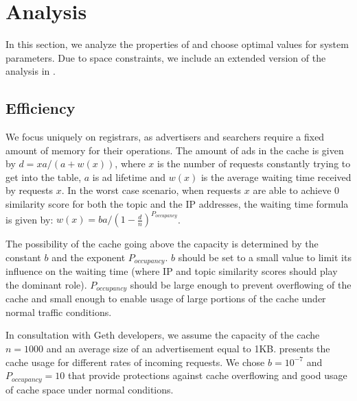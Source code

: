 \section{Analysis}\label{sec:analysis}
In this section, we analyze the properties of \sysname and choose optimal values for system parameters. Due to space constraints, we include an extended version of the analysis in .
\subsection{Efficiency}

We focus uniquely on registrars, as advertisers and searchers require a fixed amount of memory for their operations. The amount of ads in the cache is given by $d = xa/(a + w(x))$, where $x$ is the number of requests constantly trying to get into the table, $a$ is ad lifetime and $w(x)$ is the average waiting time received by requests $x$.
In the worst case scenario, when requests $x$ are able to achieve 0 similarity score for both the topic and the IP addresses, the waiting time formula is given by: $w(x) = ba/(1 - \frac{d}{n})^{P_\textit{occupancy}}$.

The possibility of the cache going above the capacity is determined by the constant $b$ and the exponent $P_\textit{occupancy}$. $b$ should be set to a small value to limit its influence on the waiting time (where IP and topic similarity scores should play the dominant role). $P_\textit{occupancy}$ should be large enough to prevent overflowing of the cache and small enough to enable usage of large portions of the cache under normal traffic conditions. 

In consultation with Geth developers, we assume the capacity of the cache $n = 1000$ and an average size of an advertisement equal to 1KB.  presents the cache usage for different rates of incoming requests. We chose $b=10^{-7}$ and $P_\textit{occupancy}=10$ that provide protections against cache overflowing and good usage of cache space under normal conditions. 

